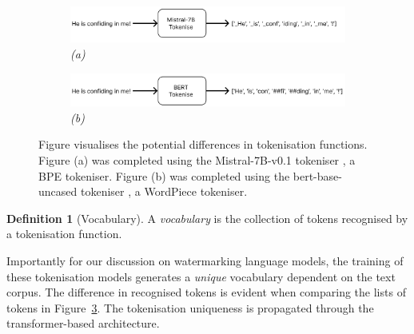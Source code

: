 \documentclass{l4proj}
\theoremstyle{definition}
\newtheorem{definition}{Definition}[section]
\newcommand{\codefont}[1]{{\fontfamily{qcr}\selectfont #1}}
\begin{document}
        \begin{figure}[!h]
            \captionsetup[subfigure]{labelformat=empty}
            \centering
            \begin{subfigure}{\textwidth}
                \includegraphics[width=\linewidth]{images/background/tokenisation-process-mistral.png}
                \caption{\emph{(a)}}
                \label{fig:tokenisation-process-mistral}
            \end{subfigure}

            \begin{subfigure}{\textwidth}
                \includegraphics[width=\linewidth]{images/background/tokenisation-process-bert.png}
                \caption{\emph{(b)}}
                \label{fig:tokenisation-process-bert}
            \end{subfigure}

            \caption{Figure visualises the potential differences in tokenisation functions. Figure (a) was completed using the \codefont{Mistral-7B-v0.1} tokeniser \citep{jiang2023mistral}, a BPE tokeniser. Figure (b) was completed using the \codefont{bert-base-uncased} tokeniser \citep{DBLP:journals/corr/abs-1810-04805}, a WordPiece tokeniser.}
            \label{fig:tokenisation-process}
        \end{figure}

        \begin{definition}[Vocabulary]
            A \emph{vocabulary} is the collection of tokens recognised by a tokenisation function.
        \end{definition}

        Importantly for our discussion on watermarking language models, the training of these tokenisation models generates a \emph{unique} vocabulary dependent on the text corpus. The difference in recognised tokens is evident when comparing the lists of tokens in Figure~\ref{fig:tokenisation-process}. The tokenisation uniqueness is propagated through the transformer-based architecture.

        
    
\end{document}
